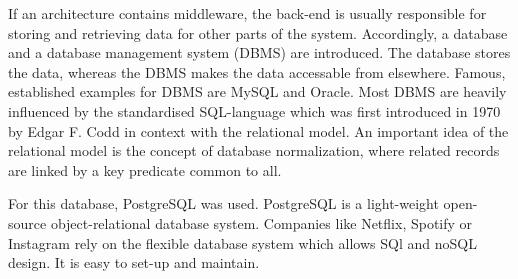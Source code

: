 If an architecture contains middleware, the back-end is usually responsible for storing and retrieving data for other parts of the system.
Accordingly, a database and a database management system (DBMS) are introduced.
The database stores the data, whereas the DBMS makes the data accessable from elsewhere.
Famous, established examples for DBMS are MySQL and Oracle.
Most DBMS are heavily influenced by the standardised SQL-language which was first introduced in 1970 by Edgar F. Codd in context with the relational model.
An important idea of the relational model is the concept of database normalization, where related records are linked by a key predicate common to all.

For this database, PostgreSQL was used.
PostgreSQL is a light-weight open-source object-relational database system. 
Companies like Netflix, Spotify or Instagram \parencite{postgresUsers} rely on the flexible database system which allows SQl and noSQL design.
It is easy to set-up and maintain. 


